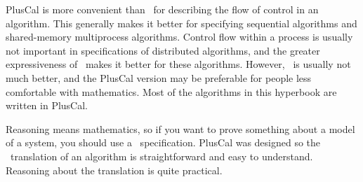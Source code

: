 PlusCal is more convenient than \tlaplus\ for describing the flow of
control in an algorithm.  This generally makes it better for
specifying sequential algorithms and shared-memory multiprocess
algorithms.  Control flow within a process is usually not important in
specifications of distributed algorithms, and the greater
expressiveness of \tlaplus\ makes it better for these algorithms.
However, \tlaplus\ is usually not much better, and the PlusCal version
may be preferable for people less comfortable with mathematics.  
Most of the algorithms in this hyperbook are written in PlusCal.

Reasoning means mathematics, so if you want to prove something about a
model of a system, you should use a \tlaplus\ specification.  PlusCal
was designed so the \tlaplus\ translation of an algorithm is 
straightforward and easy to understand.  Reasoning about the
translation is quite practical.

